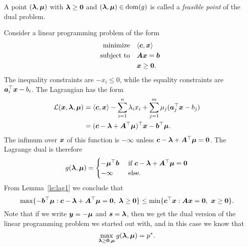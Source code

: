 A point $(\bm{\lambda},\bm{\mu})$ with $\bm{\lambda}\geq \bm{0}$ and $(\bm{\lambda},\bm{\mu})\in \mathrm{dom}(g)$ is called a {\em feasible point} of the dual problem.

\begin{example}
 Consider a linear programming problem of the form
 \begin{align*}
  \text{minimize}\quad & \langle {\bm{c}}, {\bm{x}} \rangle\\
  \quad\text{subject to}\quad & \bm{A}\bm{x}=\bm{b}\\
  & \bm{x}\geq \bm{0}.
 \end{align*}
The inequality constraints are $-x_i\leq 0$, while the equality constraints are $\bm{a}_i^{\top}\bm{x}-b_i$. The Lagrangian has the form
\begin{align*}
 \mathcal{L}(\bm{x},\bm{\lambda},\bm{\mu}) &= \langle {\bm{c}}, {\bm{x}} \rangle-\sum_{i=1}^n \lambda_i x_i + \sum_{j=1}^m \mu_j(\bm{a}_j^{\top}\bm{x}-b_j)\\
 &= (\bm{c}-\bm{\lambda}+\bm{A}^{\top}\bm{\mu})^{\top}\bm{x}-\bm{b}^{\top}\bm{\mu}.
\end{align*}
The infimum over $\bm{x}$ of this function is $-\infty$ unless $\bm{c}-\bm{\lambda}+\bm{A}^{\top}\bm{\mu}= \bm{0}$. The Lagrange dual is therefore
\begin{equation*}
 g(\bm{\lambda},\bm{\mu}) = \begin{cases} 
                               -\bm{\mu}^{\top}\bm{b} & \text{ if } \bm{c}-\bm{\lambda}+\bm{A}^{\top}\bm{\mu}=\bm{0}\\
                               -\infty & \text{ else.}
                              \end{cases}
\end{equation*}
From Lemma~\ref{le:lag1} we conclude that
\begin{equation*}
 \max \{-\vct{b}^{\trans}\vct{\mu} \mid \vct{c}-\vct{\lambda}+\mtx{A}^{\trans}\vct{\mu}=\zerovct, \ \vct{\lambda}\geq \zerovct\} \leq \min \{\vct{c}^{\trans}\vct{x} \mid \mtx{A}\vct{x}=\zerovct, \ \vct{x}\geq \zerovct\}.
\end{equation*}
Note that if we write $\bm{y}=-\bm{\mu}$ and $\bm{s}=\bm{\lambda}$, then we get the dual version of the linear programming problem we started out with, and in this case we know that 
\begin{equation*}
 \max_{\bm{\lambda}\geq \bm{0},\bm{\mu}} g(\bm{\lambda},\bm{\mu}) = p^*.
\end{equation*}
\end{example}


